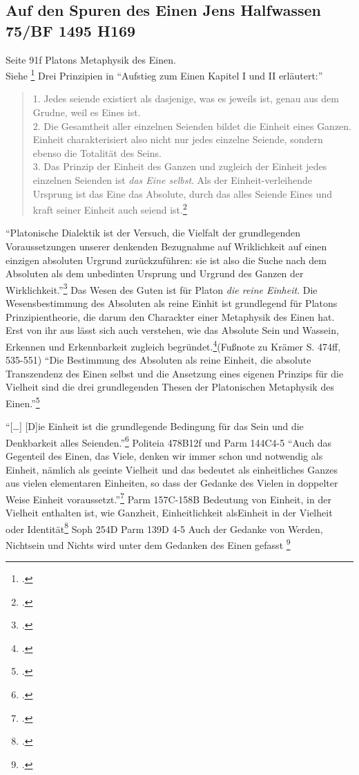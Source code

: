 \documentclass[12pt]{article}
\newcommand*{\zitatblock}[1]{%
    \begin{quote}
    \fontsize{10}{12}\selectfont
    \setlength{\parskip}{1.0em}
    #1
    \end{quote}
}
\begin{document}
\subsection*{Auf den Spuren des Einen Jens Halfwassen  75/BF 1495 H169}
Seite 91f Platons Metaphysik des Einen.\\
Siehe \footcite[][]{halfwassen2015spuren}
Drei Prinzipien in \enquote{Aufstieg zum Einen Kapitel I und II erläutert:} \zitatblock{1. Jedes seiende existiert als dasjenige, was es jeweils ist, genau aus dem Grudne, weil es Eines ist.\\2. Die Gesamtheit aller einzelnen Seienden bildet die Einheit eines Ganzen. Einheit charakterisiert also nicht nur jedes einzelne Seiende, sondern ebenso die Totalität des Seins.\\3. Das Prinzip der Einheit des Ganzen und zugleich der Einheit jedes einzelnen Seienden ist \emph{das Eine selbst}. Als der Einheit-verleihende Ursprung ist das Eine das Absolute, durch das alles Seiende Eines und kraft seiner Einheit auch seiend ist.\footcite[][S. 91]{halfwassen2015spuren}}

\enquote{Platonische Dialektik ist der Versuch, die Vielfalt der grundlegenden Voraussetzungen unserer denkenden Bezugnahme auf Wriklichkeit auf einen einzigen absoluten Urgrund zurückzuführen: sie ist also die Suche nach dem Absoluten als dem unbedinten Ursprung und Urgrund des Ganzen der Wirklichkeit.}\footcite[][S. 95]{halfwassen2015spuren}
Das Wesen des Guten ist für Platon \emph{die reine Einheit}. Die Wesensbestimmung des Absoluten als reine Einhit ist grundlegend für Platons Prinzipientheorie, die darum den Charackter einer Metaphysik des Einen hat. Erst von ihr aus lässt sich auch verstehen, wie das Absolute Sein und Wassein, Erkennen und Erkennbarkeit zugleich begründet.\footcite[][S. 96]{halfwassen2015spuren}(Fußnote zu Krämer S. 474ff, 535-551)
\enquote{Die Bestimmung des Absoluten als reine Einheit, die absolute Transzendenz des Einen selbst und die Ansetzung eines eigenen Prinzips für die Vielheit sind die drei grundlegenden Thesen der Platonischen Metaphysik des Einen.}\footcite[][S. 96]{halfwassen2015spuren}

\enquote{[\dots] [D]ie Einheit ist die grundlegende Bedingung für das Sein und die Denkbarkeit alles Seienden.}\footcite[vgl.][S. 97]{halfwassen2015spuren} Politeia 478B12f und Parm 144C4-5
\enquote{Auch das Gegenteil des Einen, das Viele, denken wir immer schon und notwendig als Einheit, nämlich als geeinte Vielheit und das bedeutet als einheitliches Ganzes aus vielen elementaren Einheiten, so dass der Gedanke des Vielen in doppelter Weise Einheit voraussetzt.}\footcite[][S. 97]{halfwassen2015spuren} Parm 157C-158B
Bedeutung von Einheit, in der Vielheit enthalten ist, wie Ganzheit, Einheitlichkeit alsEinheit in der Vielheit oder Identität\footcite[vgl.][S. 97]{halfwassen2015spuren} Soph 254D Parm 139D 4-5
Auch der Gedanke von Werden, Nichtsein und Nichts wird unter dem Gedanken des Einen gefasst \footcite[vgl.][S. 97]{halfwassen2015spuren}
\end{document}
